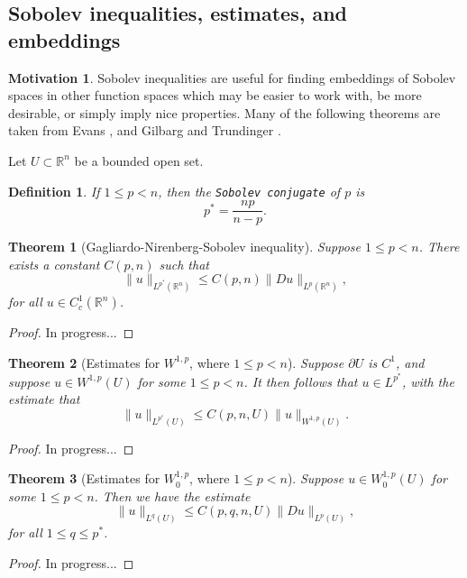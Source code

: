 \documentclass[11pt]{article}
\newtheorem{theorem}{Theorem}
\newtheorem{definition}{Definition}
\theoremstyle{definition}
\newtheorem*{motivation}{Motivation}
\begin{document}
\newpage

\subsection{Sobolev inequalities, estimates, and embeddings}
\begin{motivation}
Sobolev inequalities are useful for finding embeddings of Sobolev spaces in other function spaces which may be easier to work with, be more desirable,
or simply imply nice properties. Many of the following theorems are taken from Evans \cite{evans1998partial}, and Gilbarg and Trundinger \cite{gilbarg2001elliptic}.
\end{motivation}
Let $U \subset \mathbb{R}^n$ be a bounded open set.

\begin{definition}
	If $1 \leq p < n$, then the \texttt{Sobolev conjugate} of $p$ is
	\begin{equation*}
		p^* = \frac{np}{n-p}.
	\end{equation*}
\end{definition}

\begin{theorem}[Gagliardo-Nirenberg-Sobolev inequality]
Suppose $1\leq p < n$. There exists a constant $C(p,n)$ such that
	\[\|u\|_{L^{p^*}(\mathbb{R}^n)} \leq C(p,n)\|Du\|_{L^{p}(\mathbb{R}^n)},\]
for all $u \in C_{c}^{1}(\mathbb{R}^n)$.
\end{theorem}
\begin{proof}
In progress...
\end{proof}

\begin{theorem}[Estimates for $W^{1,p}$, where $1 \leq p < n$]
Suppose $\partial U$ is $C^1$,
and suppose $u \in W^{1,p}(U)$ for some $1 \leq p < n$. It then follows that $u \in L^{p^*}$, with the estimate that
	\[\|u\|_{L^{p^*}(U)} \leq C(p,n,U)\|u\|_{W^{1,p}(U)}.\]
\end{theorem}
\begin{proof}
In progress...
\end{proof}

\begin{theorem}[Estimates for $W_{0}^{1,p}$, where $1 \leq p < n$]
	Suppose $u \in W_{0}^{1,p}(U)$ for some $1 \leq p < n$. Then we have the estimate
	\[\|u\|_{L^{q}(U)} \leq C(p,q,n,U)\|Du\|_{L^{p}(U)},\]
	for all $1 \leq q \leq p^*$.
\end{theorem}
\begin{proof}
In progress...
\end{proof}
\end{document}
